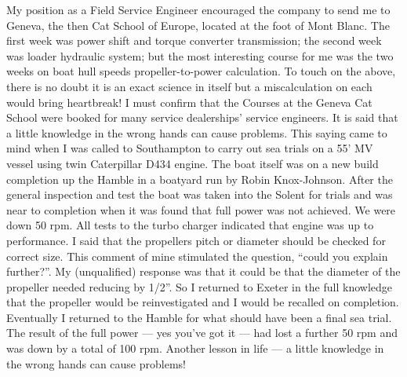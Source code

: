 My position as a Field Service Engineer encouraged the company to send me to
Geneva, the then Cat School of Europe, located at the foot of Mont Blanc. The
first week was power shift and torque converter transmission; the second week
was loader hydraulic system; but the most interesting course for me was the two
weeks on boat hull speeds propeller-to-power calculation. To touch on the
above, there is no doubt it is an exact science in itself but a miscalculation
on each would bring heartbreak! I must confirm that the Courses at the Geneva
Cat School were booked for many service dealerships' service engineers. It is
said that a little knowledge in the wrong hands can cause problems. This saying
came to mind when I was called to Southampton to carry out sea trials on a 55'
MV vessel using twin Caterpillar D434 engine. The boat itself was on a new
build completion up the Hamble in a boatyard run by Robin Knox-Johnson. After
the general inspection and test the boat was taken into the Solent for trials
and was near to completion when it was found that full power was not achieved.
We were down 50 rpm. All tests to the turbo charger indicated that engine was
up to performance. I said that the propellers pitch or diameter should be
checked for correct size. This comment of mine stimulated the question, ``could
you explain further?''. My (unqualified) response was that it could be that the
diameter of the propeller needed reducing by 1/2''. So I returned to Exeter in
the full knowledge that the propeller would be reinvestigated and I would be
recalled on completion. Eventually I returned to the Hamble for what should
have been a final sea trial. The result of the full power --- yes you've got
it --- had lost a further 50 rpm and was down by a total of 100 rpm. Another
lesson in life --- a little knowledge in the wrong hands can cause problems!
